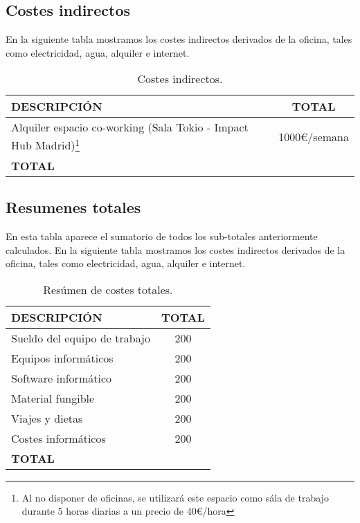 \documentclass[10pt,a4paper,oldfontcommands]{dpds}
\begin{document}
\subsection{Costes indirectos}
En la siguiente tabla mostramos los costes indirectos derivados de la oficina, tales como electricidad, agua, alquiler e internet.
\begin{table}[H]
\begin{center}
\begin{tabular}{l c}
\hline
\textbf{DESCRIPCIÓN} & \textbf{TOTAL}\\ \hline \hline
Alquiler espacio co-working (Sala Tokio - Impact Hub Madrid)\footnote{Al no disponer de oficinas, se utilizará este espacio como sála de trabajo durante 5 horas diarias a un precio de 40\euro/hora} & 1000\euro/semana\\ \hline \hline
\textbf{TOTAL} & \\ \hline
\end{tabular}
\caption{Costes indirectos.}
\label{tab:indirectos}
\end{center}
\end{table}


\subsection{Resumenes totales}
En esta tabla aparece el sumatorio de todos los sub-totales anteriormente calculados.
En la siguiente tabla mostramos los costes indirectos derivados de la oficina, tales como electricidad, agua, alquiler e internet.
\begin{table}[H]
\begin{center}
\begin{tabular}{l c}
\hline
\textbf{DESCRIPCIÓN} & \textbf{TOTAL}\\ \hline \hline
Sueldo del equipo de trabajo & 200\\
Equipos informáticos & 200\\
Software informático & 200\\
Material fungible & 200\\
Viajes y dietas & 200\\
Costes informáticos & 200\\ \hline \hline
\textbf{TOTAL} & \\ \hline
\end{tabular}
\caption{Resúmen de costes totales.}
\label{tab:resumenTotal}
\end{center}
\end{table}
\end{document}
